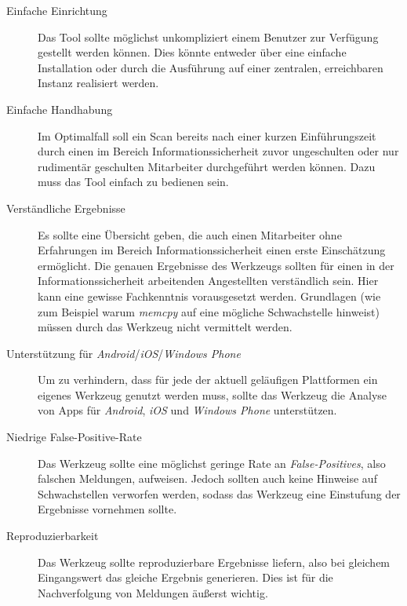 \begin{description}
	\item[Einfache Einrichtung] Das Tool sollte möglichst unkompliziert einem Benutzer zur Verfügung gestellt werden können. Dies könnte entweder über eine einfache Installation oder durch die Ausführung auf einer zentralen, erreichbaren Instanz realisiert werden.
	
	\item[Einfache Handhabung] Im Optimalfall soll ein Scan bereits nach einer kurzen Einführungszeit durch einen im Bereich Informationssicherheit zuvor ungeschulten oder nur rudimentär geschulten Mitarbeiter durchgeführt werden können. Dazu muss das Tool einfach zu bedienen sein.
	
	\item[Verständliche Ergebnisse] Es sollte eine Übersicht geben, die auch einen Mitarbeiter ohne Erfahrungen im Bereich Informationssicherheit einen erste Einschätzung ermöglicht. Die genauen Ergebnisse des Werkzeugs sollten für einen in der Informationssicherheit arbeitenden Angestellten verständlich sein. Hier kann eine gewisse Fachkenntnis vorausgesetzt werden. Grundlagen (wie zum Beispiel warum \textit{memcpy} auf eine mögliche Schwachstelle hinweist) müssen durch das Werkzeug nicht vermittelt werden.
	
	\item[Unterstützung für \textit{Android}/\textit{iOS}/\textit{Windows Phone}] Um zu verhindern, dass für jede der aktuell geläufigen Plattformen ein eigenes Werkzeug genutzt werden muss, sollte das Werkzeug die Analyse von Apps für \textit{Android}, \textit{iOS} und \textit{Windows Phone} unterstützen.
	
	\item[Niedrige False-Positive-Rate] Das Werkzeug sollte eine möglichst geringe Rate an \textit{False-Positives}, also falschen Meldungen, aufweisen. Jedoch sollten auch keine Hinweise auf Schwachstellen verworfen werden, sodass das Werkzeug eine Einstufung der Ergebnisse vornehmen sollte.
	
	\item[Reproduzierbarkeit] Das Werkzeug sollte reproduzierbare Ergebnisse liefern, also bei gleichem Eingangswert das gleiche Ergebnis generieren. Dies ist für die Nachverfolgung von Meldungen äußerst wichtig.
	
\end{description}



